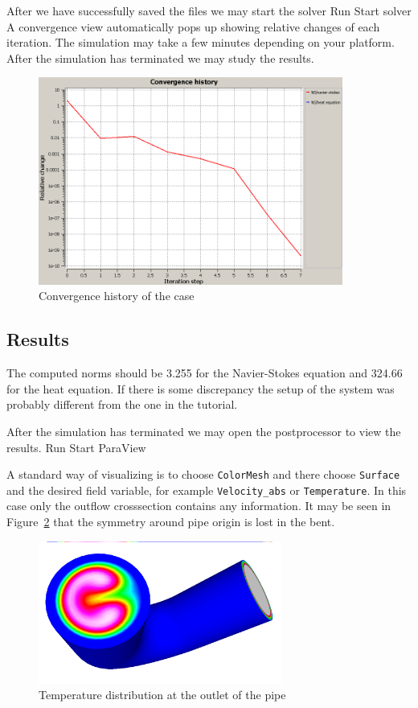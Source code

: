 After we have successfully saved the files we may start the solver
\ttbegin
Run
  Start solver
\ttend
A convergence view automatically pops up showing relative changes of each iteration.
The simulation may take a few minutes depending on your platform. 
After the simulation has terminated we may study the results.
\begin{figure}[h]
\centering
\includegraphics[width=10cm]{curved_pipe_convergence}
\caption{Convergence history of the case}\label{fg:curved_pipe_convergence}
\end{figure} 

\subsection*{Results}

The computed norms should be 3.255 for the Navier-Stokes equation and
324.66 for the heat equation. If there is some discrepancy the setup of the system
was probably different from the one in the tutorial.

After the simulation has terminated we may open the postprocessor to view the results.
\ttbegin
Run
  Start ParaView
\ttend

A standard way of visualizing is to choose \texttt{ColorMesh} and 
there choose \texttt{Surface} and the desired field variable, for example 
\texttt{Velocity\_abs} or \texttt{Temperature}. In this case only the 
outflow crosssection contains any information. It may be seen in 
Figure~\ref{fg:curved_pipe_temp_end} that the symmetry around pipe origin is lost in the 
bent. 
\begin{figure}[h]
\centering
\includegraphics[width=8cm, viewport=0 20 1024 580,clip]{curved_pipe_velo_end}
\caption{Temperature distribution at the outlet of the pipe}\label{fg:curved_pipe_temp_end}
\end{figure} 

